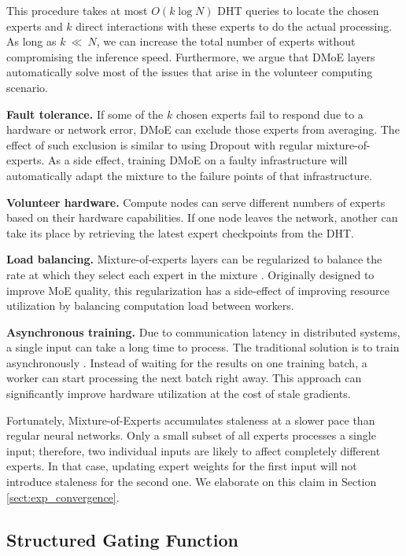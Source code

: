 This procedure takes at most $O(k \log N)$ DHT queries to locate the chosen experts and $k$ direct interactions with these experts to do the actual processing. As long as $k~\ll~N$, we can increase the total number of experts without compromising the inference speed. Furthermore, we argue that DMoE layers automatically solve most of the issues that arise in the volunteer computing scenario.

\textbf{Fault tolerance.} If some of the $k$ chosen experts fail to respond due to a hardware or network error, DMoE can exclude those experts from averaging. The effect of such exclusion is similar to using Dropout  \cite{srivastava2014dropout} with regular mixture-of-experts. As a side effect, training DMoE on a faulty infrastructure will automatically adapt the mixture to the failure points of that infrastructure.

\textbf{Volunteer hardware.} Compute nodes can serve different numbers of experts based on their hardware capabilities. If one node leaves the network, another can take its place by retrieving the latest expert checkpoints from the DHT.

\textbf{Load balancing.} Mixture-of-experts layers can be regularized to balance the rate at which they select each expert in the mixture \cite{shazeer2017outrageously, pkm}. Originally designed to improve MoE quality, this regularization has a side-effect of improving resource utilization by balancing computation load between workers.

\textbf{Asynchronous training.} Due to communication latency in distributed systems, a single input can take a long time to process. The traditional solution is to train asynchronously \cite{volunteer_dl_async}. Instead of waiting for the results on one training batch, a worker can start processing the next batch right away. This approach can significantly improve hardware utilization at the cost of stale gradients. 

Fortunately, Mixture-of-Experts accumulates staleness at a slower pace than regular neural networks. Only a small subset of all experts processes a single input; therefore, two individual inputs are likely to affect completely different experts. In that case, updating expert weights for the first input will not introduce staleness for the second one.
We elaborate on this claim in Section \ref{sect:exp_convergence}.

\vspace{-3px}
\subsection{Structured Gating Function}\label{sect:method_gating}
\vspace{-2px}

